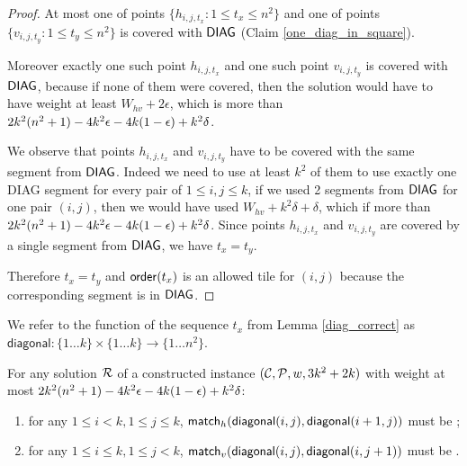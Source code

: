 \begin{proof}
At most one of points $\{h_{i,j,t_x} : 1 \le t_x \le n^2\}$
and one of points $\{v_{i,j,t_y} : 1 \le t_y \le n^2\}$
is covered with $\mathsf{DIAG}$
(Claim \ref{one_diag_in_square}).
	
Moreover exactly one such point $h_{i,j,t_x}$ and one such point $v_{i,j,t_y}$
is covered with $\mathsf{DIAG}$,
because if none of them were covered, then the solution would have to
have weight at least $W_{hv} + 2\epsilon$, which is more than $2k^2(n^2+1) - 4k^2\epsilon -4k(1-\epsilon) +k^2\delta$.

We observe that points $h_{i,j,t_x}$ and $v_{i,j,t_y}$
have to be covered with the same segment from $\mathsf{DIAG}$.
Indeed we need to use at least $k^2$ of them to use
exactly one DIAG segment for every pair of $1 \le i,j \le k$,
if we used 2 segments from $\mathsf{DIAG}$
for one pair $(i,j)$,
then we would have used $W_{hv} + k^2\delta + \delta$,
which if more than $2k^2(n^2+1) - 4k^2\epsilon -4k(1-\epsilon) +k^2\delta$.
Since points $h_{i,j,t_x}$ and $v_{i,j,t_y}$ are covered by
a single segment from $\mathsf{DIAG}$, we have $t_x = t_y$.

Therefore $t_x = t_y$
and $\mathsf{order}(t_x)$ is an allowed tile for $(i,j)$
because the corresponding segment is in $\mathsf{DIAG}$.
\end{proof}

\newcommand{\diagonal}{\mathsf{diagonal}}

We refer to the function of the sequence $t_x$ from Lemma \ref{diag_correct}
as $\diagonal : \{1 \ldots k\} \times \{1 \ldots k\} \rightarrow \{1 \ldots n^2\}$.

\begin{lemma}
\label{vertical_horizontal_synchronized}
For any solution $\mathcal{R}$
of a constructed instance $(\mathcal{C}, \mathcal{P}, w, 3k^2+2k)$
with weight at most $2k^2(n^2+1) - 4k^2\epsilon -4k(1-\epsilon) +k^2\delta$:
\begin{enumerate}
\item 
for any $1 \le i < k, 1 \le j \le k$,
$\matchh(\diagonal(i, j),\diagonal(i+1, j))$ must be \true;
\item 
for any $1 \le i \le k, 1 \le j < k$,
$\matchv(\diagonal(i, j),\diagonal(i, j+1))$ must be \true.
\end{enumerate}
\end{lemma}

